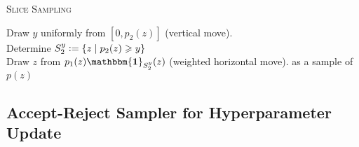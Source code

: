{\fontsize{4}{4}\selectfont
\begin{algorithm}[t]
\caption{\textsc{Slice Sampling}}
    {
    Draw $y$ uniformly from $\left[0,p_2(z)\right]$ (vertical move).\\
    Determine $S_2^y \mathrel{\mathop:}= \left\lbrace z \;|\; p_2(z) \geqslant y \right\rbrace$\\
	Draw $z$ from $p_1(z) \mathbf{\mathbbm{1}}_{S^y_2}(z)$ (weighted horizontal move).
    }
{ as a sample of $p(z)$}
\label{alg:Slice}
\end{algorithm}
}


\subsection{Accept-Reject Sampler for Hyperparameter Update} %

